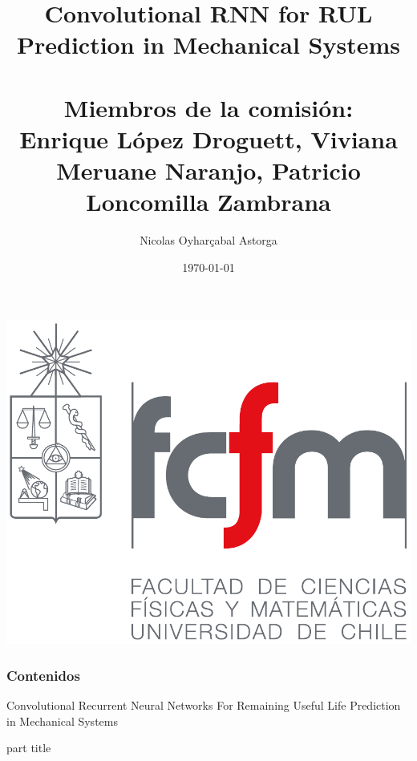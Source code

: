 \documentclass[aspectratio=169]{beamer}
\title[Presentación ME6909-1]{\Large{Convolutional RNN for RUL Prediction in Mechanical Systems}\qquad \\
\\
\qquad \small{Miembros de la comisión:}\\
\qquad \small{Enrique López Droguett, Viviana Meruane Naranjo, Patricio Loncomilla Zambrana}}
\subtitle{}
\author[Nicolas Oyharçabal Astorga]{\Large{Nicolas Oyharçabal Astorga}}
\institute[DIMEC UChile] %
\date{\today}
\begin{document}
\begin{frame}[plain]{}

\includegraphics[height=0.35\textheight]{animate/fcfm.pdf}

    \maketitle
\end{frame}



\begin{frame}

\frametitle{Contenidos}
\tableofcontents
\end{frame}




\AtBeginSection
{
\begin{frame}{{Convolutional Recurrent Neural Networks For Remaining Useful Life Prediction in Mechanical Systems}}
\begin{center}
\begin{beamercolorbox}[
sep=8pt,center]{part title}
\insertsection
\end{beamercolorbox}
\tableofcontents[currentsection,sectionstyle=hide,subsectionstyle=show/hide]
\end{center}
\end{frame}
}
\end{document}
